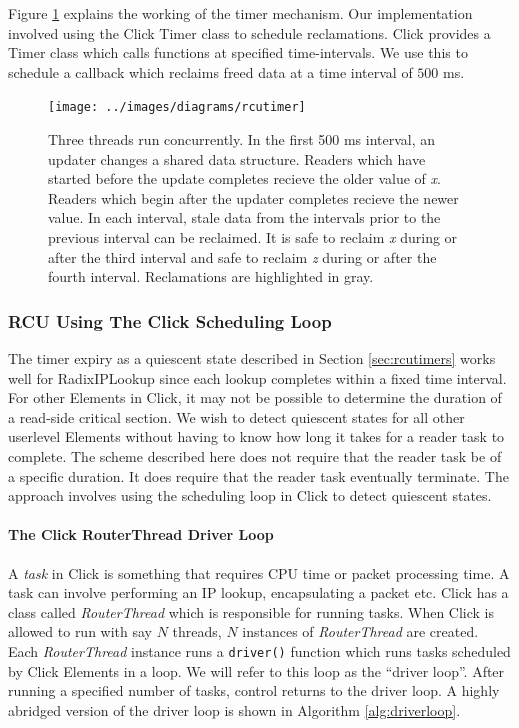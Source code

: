 \documentclass[a4paper]{article}
\begin{document}
Figure \ref{fig:rcutimer} explains the working of the timer mechanism. Our implementation involved using the Click Timer class to schedule reclamations. Click provides a Timer class which calls functions at specified time-intervals. We use this to schedule a callback which reclaims freed data at a time interval of $500$ ms.
\begin{figure}[float=tph]
\begin{center}
\texttt{[image: ../images/diagrams/rcutimer]}
\caption{ Three threads run concurrently. In the first 500 ms interval, an updater changes a shared data structure. Readers which have started before the update completes recieve the older value of \emph{x}. Readers which begin after the updater completes recieve the newer value. In each interval, stale data from the intervals prior to the previous interval can be reclaimed. It is safe to reclaim \emph{x} during or after the third interval and safe to reclaim \emph{z} during or after the fourth interval. Reclamations are highlighted in gray.
}
\label{fig:rcutimer}
\end{center}
\end{figure}

\pagebreak
\subsubsection{RCU Using The Click Scheduling Loop}
\label{sec:rcuschedloop}

The timer expiry as a quiescent state described in Section \ref{sec:rcutimers} works well for RadixIPLookup since each lookup completes within a fixed time interval. For other Elements in Click, it may not be possible to determine the duration of a read-side critical section. We wish to detect quiescent states for all other userlevel Elements without having to know how long it takes for a reader task to complete. The scheme described here does not require that the reader task be of a specific duration. It does require that the reader task eventually terminate. The approach involves using the scheduling loop in Click to detect quiescent states. 

\paragraph{The Click RouterThread Driver Loop}
A \emph{task} in Click is something that requires CPU time or packet processing time. A task can involve performing an IP lookup, encapsulating a packet etc. Click has a class called \emph{RouterThread} which is responsible for running tasks. When Click is allowed to run with say $N$ threads, $N$ instances of \emph{RouterThread} are created. Each \emph{RouterThread} instance runs a \verb+driver()+ function which runs tasks scheduled by Click Elements in a loop. We will refer to this loop as the ``driver loop''. After running a specified number of tasks, control returns to the driver loop. A highly abridged version of the driver loop is shown in Algorithm \ref{alg:driverloop}.
\end{document}
